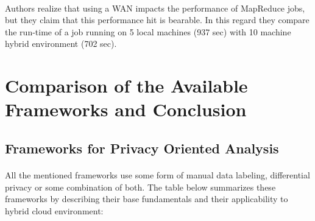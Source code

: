 \documentclass[12pt]{report}
\theoremstyle{named}
\begin{document}
\paragraph{}
Authors realize that using a WAN impacts the performance of MapReduce jobs, but they claim that this performance hit is bearable. In this regard they compare the run-time of a job running on 5 local machines (937 sec) with 10 machine hybrid environment (702 sec).

\section{Comparison of the Available Frameworks and Conclusion}
\subsection{Frameworks for Privacy Oriented Analysis}
\paragraph{}
All the mentioned frameworks use some form of manual data labeling, differential privacy or some combination of both. The table below summarizes these frameworks by describing their base fundamentals and their applicability to hybrid cloud environment:


\begin{table}[ht]
\centering
\caption{Frameworks for privacy Oriented Analysis}
\label{Frameworks for privacy Oriented Analysis}
\end{table}
\end{document}
